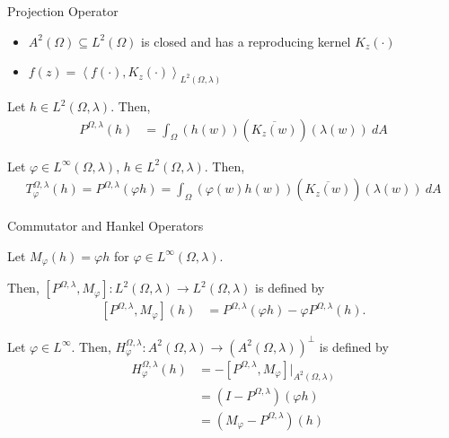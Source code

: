 \documentclass{beamer}
\newcommand{\iprod}[2]{\left\langle #1,#2 \right\rangle}
\begin{document}
\begin{frame}{Projection Operator}
  \begin{itemize}
    \item $A^{2}(\Omega)\subseteq L^{2}\left(\Omega\right)$ is closed and has a reproducing kernel $K_{z}(\cdot)$
    \item $\displaystyle f(z) = \iprod{f(\cdot)}{K_z(\cdot)}_{L^{2}(\Omega,\lambda)}$
  \end{itemize}
  \begin{definition}
    Let $h\in L^{2}\left(\Omega,\lambda\right)$. Then,
    \begin{align*}
      P^{\Omega,\lambda}\left(h\right) &= \int_{\Omega}^{} \left(h(w)\right)\left(\overline{K_z(w)}\right)\left(\lambda(w)\right)\:dA
    \end{align*}
  \end{definition}
  \begin{definition}
    Let $\varphi \in L^{\infty}\left(\Omega,\lambda\right)$, $h\in L^{2}\left(\Omega,\lambda\right)$. Then,
    \begin{align*}
      T_{\varphi}^{\Omega,\lambda}\left(h\right) = P^{\Omega,\lambda}\left(\varphi h\right)=\int_{\Omega}^{} \left(\varphi(w)h(w)\right)\left(\overline{K_z(w)}\right)\left(\lambda(w)\right)\:dA
    \end{align*}
  \end{definition}
\end{frame}
\begin{frame}{Commutator and Hankel Operators}
  \small
  \begin{definition}[Commutator]
    Let $M_{\varphi}(h) = \varphi h$ for $\varphi \in L^{\infty}\left(\Omega,\lambda\right)$.\newline

    Then, $\left[P^{\Omega,\lambda},M_{\varphi}\right]: L^{2}\left(\Omega,\lambda\right) \rightarrow L^{2}\left(\Omega,\lambda\right)$ is defined by
    \begin{align*}
      \left[P^{\Omega,\lambda},M_{\varphi}\right](h)&= P^{\Omega,\lambda}\left(\varphi h\right) - \varphi P^{\Omega,\lambda}\left(h\right).
    \end{align*}
  \end{definition}
  \begin{definition}
    Let $\varphi \in L^{\infty}$. Then, $H^{\Omega,\lambda}_{\varphi}: A^{2}\left(\Omega,\lambda\right)\rightarrow \left(A^{2}\left(\Omega,\lambda\right)\right)^{\perp}$ is defined by
    \begin{align*}
      H_{\varphi}^{\Omega,\lambda}\left(h\right) &= -\left[P^{\Omega,\lambda},M_{\varphi}\right]\biggr\vert_{A^{2}\left(\Omega,\lambda\right)}\\
                                                 &= \left(I-P^{\Omega,\lambda}\right)\left(\varphi h\right)\\
                                                 &= \left(M_{\varphi} - P^{\Omega,\lambda}\right)\left(h\right)
    \end{align*}
  \end{definition}
\end{frame}
\end{document}
